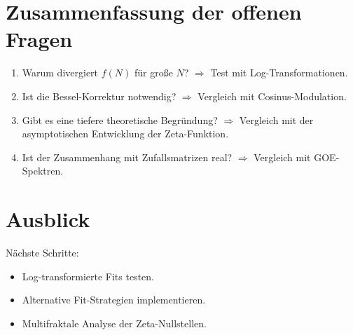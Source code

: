 \documentclass[a4paper,12pt]{article}
\begin{document}
\section{Zusammenfassung der offenen Fragen}
\begin{enumerate}
    \item Warum divergiert \( f(N) \) für große \( N \)? $\Rightarrow$ Test mit Log-Transformationen.
    \item Ist die Bessel-Korrektur notwendig? $\Rightarrow$ Vergleich mit Cosinus-Modulation.
    \item Gibt es eine tiefere theoretische Begründung? $\Rightarrow$ Vergleich mit der asymptotischen Entwicklung der Zeta-Funktion.
    \item Ist der Zusammenhang mit Zufallsmatrizen real? $\Rightarrow$ Vergleich mit GOE-Spektren.
\end{enumerate}

\section{Ausblick}
Nächste Schritte:
\begin{itemize}
    \item Log-transformierte Fits testen.
    \item Alternative Fit-Strategien implementieren.
    \item Multifraktale Analyse der Zeta-Nullstellen.
\end{itemize}
\end{document}
